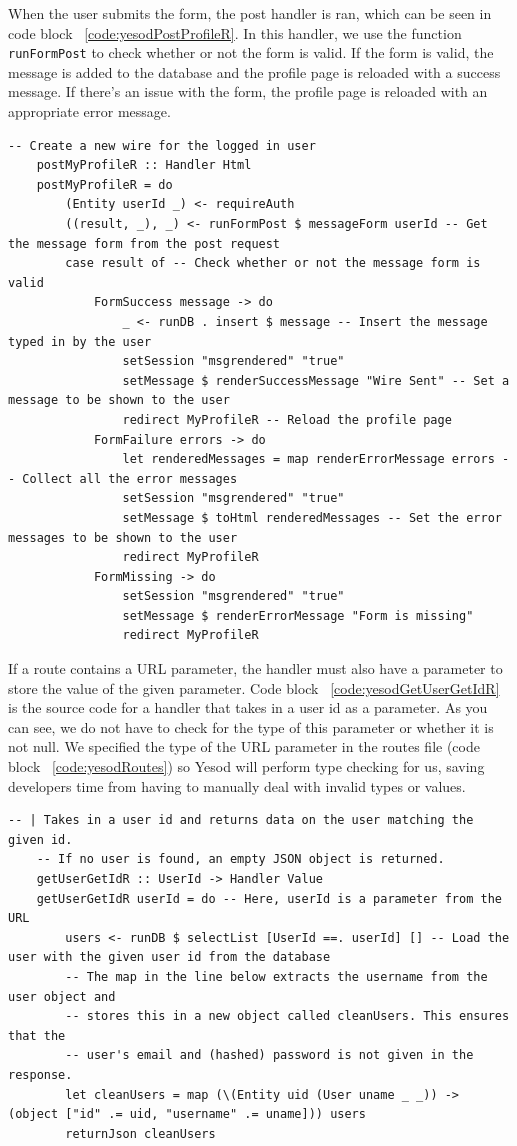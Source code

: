 When the user submits the form, the post handler is ran, which can be seen in code block
~\ref{code:yesodPostProfileR}. In this handler, we use the function \texttt{runFormPost}
to check whether or not the form is valid. If the form is valid, the message is added
to the database and the profile page is reloaded with a success message. If there's an
issue with the form, the profile page is reloaded with an appropriate error message.

\begin{lstlisting}[caption={POST request handler for current profile page},label={code:yesodPostProfileR}]
	-- Create a new wire for the logged in user
	postMyProfileR :: Handler Html
	postMyProfileR = do
		(Entity userId _) <- requireAuth
		((result, _), _) <- runFormPost $ messageForm userId -- Get the message form from the post request
		case result of -- Check whether or not the message form is valid
			FormSuccess message -> do
				_ <- runDB . insert $ message -- Insert the message typed in by the user
				setSession "msgrendered" "true"
				setMessage $ renderSuccessMessage "Wire Sent" -- Set a message to be shown to the user
				redirect MyProfileR -- Reload the profile page
			FormFailure errors -> do
				let renderedMessages = map renderErrorMessage errors -- Collect all the error messages
				setSession "msgrendered" "true"
				setMessage $ toHtml renderedMessages -- Set the error messages to be shown to the user
				redirect MyProfileR
			FormMissing -> do
				setSession "msgrendered" "true"
				setMessage $ renderErrorMessage "Form is missing"
				redirect MyProfileR
\end{lstlisting}

If a route contains a URL parameter, the handler must also have a parameter to store
the value of the given parameter. Code block ~\ref{code:yesodGetUserGetIdR} is the
source code for a handler that takes in a user id as a parameter. As you can see,
we do not have to check for the type of this parameter or whether it is not null.
We specified the type of the URL parameter in the routes file (code block ~\ref{code:yesodRoutes})
so Yesod will perform type checking for us, saving developers time from having
to manually deal with invalid types or values.

\clearpage

\begin{lstlisting}[caption={GET request handler for getting user data},label={code:yesodGetUserGetIdR}]
	-- | Takes in a user id and returns data on the user matching the given id.
	-- If no user is found, an empty JSON object is returned.
	getUserGetIdR :: UserId -> Handler Value
	getUserGetIdR userId = do -- Here, userId is a parameter from the URL
		users <- runDB $ selectList [UserId ==. userId] [] -- Load the user with the given user id from the database
		-- The map in the line below extracts the username from the user object and
		-- stores this in a new object called cleanUsers. This ensures that the
		-- user's email and (hashed) password is not given in the response. 
		let cleanUsers = map (\(Entity uid (User uname _ _)) -> (object ["id" .= uid, "username" .= uname])) users
		returnJson cleanUsers
\end{lstlisting}

